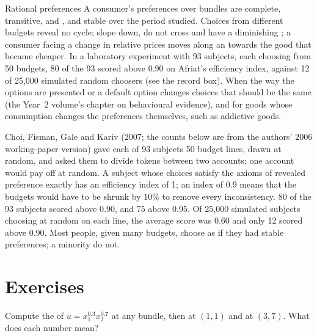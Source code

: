 \begin{model}{Rational preferences}
\assumes A consumer's preferences over bundles are complete, transitive,
 and , and stable over the period studied.
\predicts Choices from different budgets reveal no cycle;  slope down, do not cross and have a diminishing ; a consumer
facing a change in relative prices moves along an 
towards the good that became cheaper.
\tested In a laboratory experiment with 93 subjects, each choosing from 50
budgets, 80 of the 93 scored above 0.90 on Afriat's efficiency index,
against 12 of 25,000 simulated random choosers (see the record box). %
\breaks When the way the options are presented or a default option changes
choices that should be the same (the Year~2 volume's chapter on behavioural
evidence), and for goods whose consumption changes the preferences
themselves, such as addictive goods.
\end{model}

\begin{record}
Choi, Fisman, Gale and Kariv (2007; the counts below are from the
authors' 2006 working-paper version) gave each of 93 subjects 50 budget
lines, drawn at random, and asked them to divide tokens between two
accounts; one account would pay off at random. %
A subject whose choices satisfy the axioms of revealed preference exactly
has an efficiency index of 1; an index of 0.9 means that the budgets would
have to be shrunk by $10\%$ to remove every inconsistency. 80 of the 93
subjects scored above 0.90, and 75 above 0.95. %
Of 25,000 simulated subjects choosing at random on each line, the average
score was 0.60 and only 12 scored above 0.90. %
Most people, given many budgets, choose as if they had stable preferences;
a minority do not.
\end{record}

\section*{Exercises}\label{sec:b1:preferences-and-utility:exercises}

\begin{exercise}[$\star$]\label{exo:b1:preferences-and-utility:mrs-cd}
Compute the  of $u = x_1^{0.3}x_2^{0.7}$ at any bundle, then at $(1, 1)$
and at $(3, 7)$. What does each number mean?
\end{exercise}


